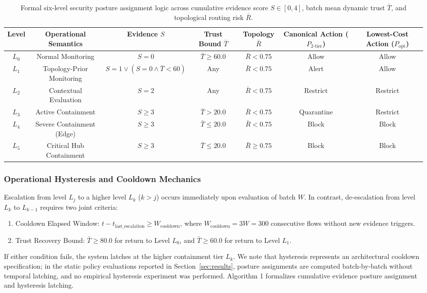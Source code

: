 \documentclass[journal,10pt,onecolumn]{IEEEtran}
\begin{document}
\begin{table}[t]
\caption{Formal six-level security posture assignment logic across cumulative evidence score $S \in [0, 4]$, batch mean dynamic trust $\bar{T}$, and topological routing risk $\bar{R}$.}
\label{tab:level_assignment}
\centering
\small
\begin{tabular}{ccccccc}
\toprule
\textbf{Level} & \textbf{Operational Semantics} & \textbf{Evidence $S$} & \textbf{Trust Bound $\bar{T}$} & \textbf{Topology $\bar{R}$} & \textbf{Canonical Action ($P_{2\text{-tier}}$)} & \textbf{Lowest-Cost Action ($P_{\text{opt}}$)} \\
\midrule
$L_0$ & Normal Monitoring & $S = 0$ & $\bar{T} \ge 60.0$ & $\bar{R} < 0.75$ & Allow & Allow \\
$L_1$ & Topology-Prior Monitoring & $S = 1 \lor (S=0 \land \bar{T}<60)$ & Any & $\bar{R} < 0.75$ & Alert & Allow \\
$L_2$ & Contextual Evaluation & $S = 2$ & Any & $\bar{R} < 0.75$ & Restrict & Restrict \\
$L_3$ & Active Containment & $S \ge 3$ & $\bar{T} > 20.0$ & $\bar{R} < 0.75$ & Quarantine & Restrict \\
$L_4$ & Severe Containment (Edge) & $S \ge 3$ & $\bar{T} \le 20.0$ & $\bar{R} < 0.75$ & Block & Block \\
$L_5$ & Critical Hub Containment & $S \ge 3$ & $\bar{T} \le 20.0$ & $\bar{R} \ge 0.75$ & Block & Block \\
\bottomrule
\end{tabular}
\end{table}

\subsubsection{Operational Hysteresis and Cooldown Mechanics}
Escalation from level $L_j$ to a higher level $L_k$ ($k > j$) occurs immediately upon evaluation of batch $W$. In contrast, de-escalation from level $L_k$ to $L_{k-1}$ requires two joint criteria:
\begin{enumerate}
    \item Cooldown Elapsed Window: $t - t_{\text{last\_escalation}} \ge W_{\text{cooldown}}$, where $W_{\text{cooldown}} = 3W = 300$ consecutive flows without new evidence triggers.
    \item Trust Recovery Bound: $\bar{T} \ge 80.0$ for return to Level $L_0$, and $\bar{T} \ge 60.0$ for return to Level $L_1$.
\end{enumerate}
If either condition fails, the system latches at the higher containment tier $L_k$. We note that hysteresis represents an architectural cooldown specification; in the static policy evaluations reported in Section~\ref{sec:results}, posture assignments are computed batch-by-batch without temporal latching, and no empirical hysteresis experiment was performed. Algorithm 1 formalizes cumulative evidence posture assignment and hysteresis latching.
\end{document}
